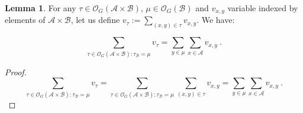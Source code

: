 \documentclass[11pt]{article}
\theoremstyle{definition}
\newtheorem{lem}[theo]{Lemma}
\theoremstyle{remark}
\begin{document}
\begin{lem}
  \label{lem:fromEleToOrbit}
  For any $\tau \in \mathcal{O}_G(\mathcal{A} \times \mathcal{B})$, $\mu \in \mathcal{O}_G(\mathcal{B})$ and $v_{x,y}$ variable indexed by elements of $\mathcal{A} \times \mathcal{B}$, let us define $v_{\tau} := \sum_{(x,y) \in \tau} v_{x,y}$. We have:

  \[ \sum_{\tau  \in \mathcal{O}_G(\mathcal{A} \times \mathcal{B}): \tau_{\mathcal{B}}=\mu} v_{\tau} = \sum_{y \in \mu} \sum_{x \in \mathcal{A}} v_{x,y} \ .\]
\end{lem}

\begin{proof}
  \[ \sum_{\tau \in \mathcal{O}_G(\mathcal{A} \times \mathcal{B}):\tau_{\mathcal{B}}=\mu} v_{\tau} =  \sum_{\tau \in \mathcal{O}_G(\mathcal{A} \times \mathcal{B}):\tau_{\mathcal{B}}=\mu} \sum_{(x,y) \in \tau} v_{x,y} = \sum_{y \in \mu} \sum_{x \in \mathcal{A}} v_{x,y} \ . \]
\end{proof}
\end{document}
